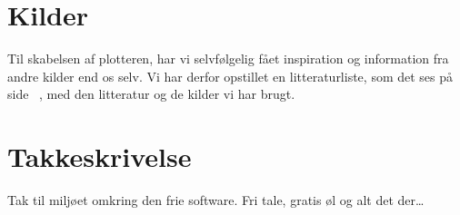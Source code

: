 \section{Kilder}
Til skabelsen af plotteren, har vi selvfølgelig fået inspiration og
information fra andre kilder end os selv. Vi har derfor opstillet en
litteraturliste, som det ses på side ~\pageref{ch:litteratur}, med den
litteratur og de kilder vi har brugt.

\section{Takkeskrivelse}


Tak til miljøet omkring den frie software. Fri tale, gratis øl og alt
det der\dots {}


